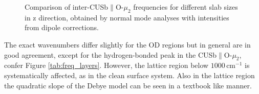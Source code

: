 \documentclass[11pt,DIV=13,BCOR=5mm,a4paper,headinclude]{scrbook}
\newcommand\todo[1]{\textcolor{red}{TODO: \textit{{#1}}}}
\begin{document}
\begin{figure}[!h]
    \centering
             \quad
             \quad
             \caption{Comparison of inter-CUSb$\parallel$O-$\mu_2$ frequencies for different slab sizes in z direction, obtained by normal mode analyses with intensities from dipole corrections.}
            \label{abb:iCb2_size_comp}
\end{figure}
The exact wavenumbers differ slightly for the OD regions but in general are in good agreement, except for the hydrogen-bonded peak in the CUSb$\parallel$O-$\mu_2$, confer Figure \ref{tab:freq_layers}.
However, the lattice region below $1000\,$cm$^{-1}$ is systematically affected, as in the clean surface system.
Also in the lattice region the quadratic slope of the Debye model can be seen in a textbook like manner.
\end{document}

